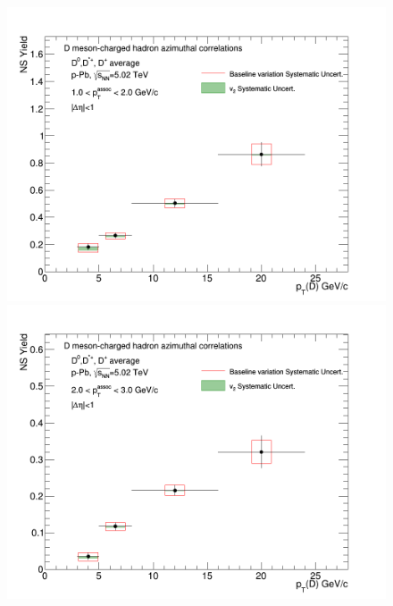 \begin{figure}[!htbp]
{\includegraphics[width=0.49\linewidth, height=0.33\linewidth]{figures/FitOutput/CanvasFinalTrendNSYield_pthad1dotto2dot.png}}
{\includegraphics[width=0.49\linewidth, height=0.33\linewidth]{figures/FitOutput/CanvasFinalTrendNSYield_pthad2dotto3dot.png}}
\end{figure}
